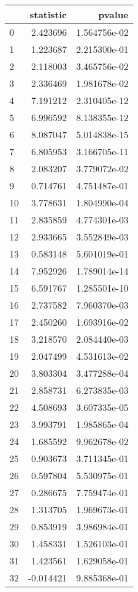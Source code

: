 \begin{tabular}{lrr}
\toprule
{} &  statistic &        pvalue \\
\midrule
0  &   2.423696 &  1.564756e-02 \\
1  &   1.223687 &  2.215300e-01 \\
2  &   2.118003 &  3.465756e-02 \\
3  &   2.336469 &  1.981678e-02 \\
4  &   7.191212 &  2.310405e-12 \\
5  &   6.996592 &  8.138355e-12 \\
6  &   8.087047 &  5.014838e-15 \\
7  &   6.805953 &  3.166705e-11 \\
8  &   2.083207 &  3.779072e-02 \\
9  &   0.714761 &  4.751487e-01 \\
10 &   3.778631 &  1.804990e-04 \\
11 &   2.835859 &  4.774301e-03 \\
12 &   2.933665 &  3.552849e-03 \\
13 &   0.583148 &  5.601019e-01 \\
14 &   7.952926 &  1.789014e-14 \\
15 &   6.591767 &  1.285501e-10 \\
16 &   2.737582 &  7.960370e-03 \\
17 &   2.450260 &  1.693916e-02 \\
18 &   3.218570 &  2.084440e-03 \\
19 &   2.047499 &  4.531613e-02 \\
20 &   3.803304 &  3.477288e-04 \\
21 &   2.858731 &  6.273835e-03 \\
22 &   4.508693 &  3.607335e-05 \\
23 &   3.993791 &  1.985865e-04 \\
24 &   1.685592 &  9.962678e-02 \\
25 &   0.903673 &  3.711345e-01 \\
26 &   0.597804 &  5.530975e-01 \\
27 &   0.286675 &  7.759474e-01 \\
28 &   1.313705 &  1.969673e-01 \\
29 &   0.853919 &  3.986984e-01 \\
30 &   1.458331 &  1.526103e-01 \\
31 &   1.423561 &  1.629058e-01 \\
32 &  -0.014421 &  9.885368e-01 \\

\end{tabular}
